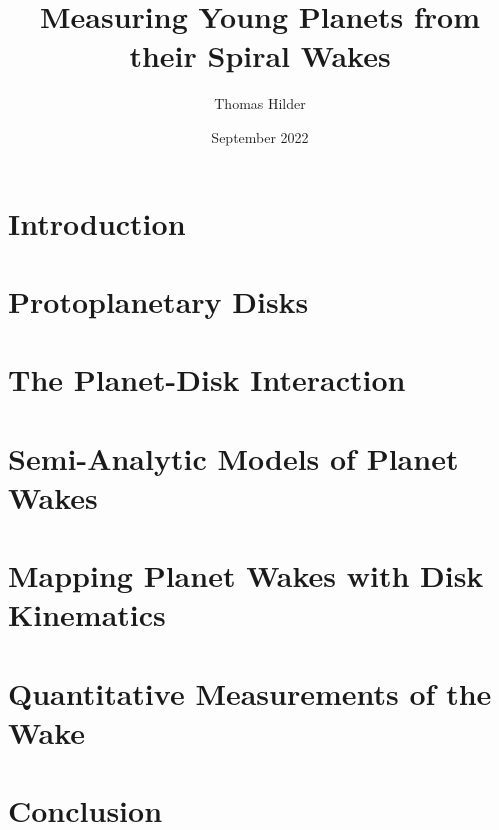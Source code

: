 \documentclass[hidelinks,11pt,a4paper,onecolumn]{report}
\title{Measuring Young Planets from their Spiral Wakes}
\author{Thomas Hilder}
\date{September 2022}
\begin{document}
    
    

    

    

    

    \tableofcontents
    \clearpage


    \chapter{Introduction}
    

    \chapter{Protoplanetary Disks}
    

    \chapter{The Planet-Disk Interaction}
    

    \chapter{Semi-Analytic Models of Planet Wakes} \label{ch:wake_models}
    

    \chapter{Mapping Planet Wakes with Disk Kinematics} \label{ch:wake_mapping}
    

    \chapter{Quantitative Measurements of the Wake}
    

    \chapter{Conclusion}
    

    \appendix
    

    
    
\end{document}
